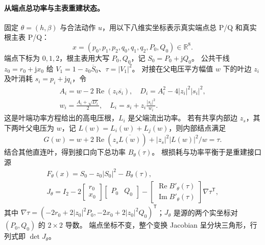\documentclass[UTF8,fontset=fandol,11pt,a4paper]{ctexart}
\newcommand{\R}{\mathbb R}
\begin{document}
\paragraph{从端点总功率与主表重建状态。}
固定 $\theta=(h,\beta)$ 与合法动作 $u$，用以下八维实坐标表示真实端点总 P/Q 和真实根主表 P/Q：
\[
 x=(p_0,p_1,p_2,q_0,q_1,q_2,P_0,Q_0)\in\R^8.
\]
端点下标为 $0,1,2$，根主表用大写 $P_0,Q_0$，记 $S_0=P_0+\mathrm jQ_0$。
公共干线 $z_0=r_0+\mathrm jx_0$ 给 $V_1=1-z_0\overline S_0$、$\tau=|V_1|^2$。
对接在父电压平方幅值 $w$ 下的叶边 $z_i$ 及叶消耗 $s_i=p_i+\mathrm jq_i$，令
\begin{equation}
 \begin{aligned}
 A_i=w-2\operatorname{Re}(z_i\overline{s_i}),\quad
 D_i=A_i^2-4|z_i|^2|s_i|^2,\\
 w_i=\frac{A_i+\sqrt{D_i}}2,\quad
 L_i=s_i+z_i\frac{|s_i|^2}{w_i}.
 \end{aligned}\label{eq:continuous-leaf}
\end{equation}
这是叶端功率方程给出的高电压根，$L_i$ 是父端流出功率。
若有共享内部边 $z_s$，其下两叶父电压为 $w$，记 $L(w)=L_i(w)+L_j(w)$，则内部结点满足
\[
 G(w)=w+2\operatorname{Re}(z_s\overline{L(w)})+|z_s|^2|L(w)|^2/w=\tau.
\]
结合其他直连叶，得到接口向下总功率 $B_\theta(\tau)$。
根损耗与功率平衡于是重建接口源
\begin{equation}
 \begin{gathered}
 F_\theta(x)=S_0-z_0|S_0|^2-B_\theta(\tau),\\
 J_\theta=I_2-2\begin{bmatrix}r_0\\x_0\end{bmatrix}
                      \begin{bmatrix}P_0&Q_0\end{bmatrix}
 -\begin{bmatrix}\operatorname{Re}B'_\theta(\tau)\\
                 \operatorname{Im}B'_\theta(\tau)\end{bmatrix}\nabla\tau^{\mathsf T},
 \end{gathered}\label{eq:continuous-source}
\end{equation}
其中 $\nabla\tau=(-2r_0+2|z_0|^2P_0,-2x_0+2|z_0|^2Q_0)^{\mathsf T}$；$J_\theta$ 是源的两个实坐标对 $(P_0,Q_0)$ 的 $2\times2$ 导数。
端点坐标不变，整个变换 Jacobian 呈分块三角形，行列式即 $\det J_\theta$。
\end{document}
